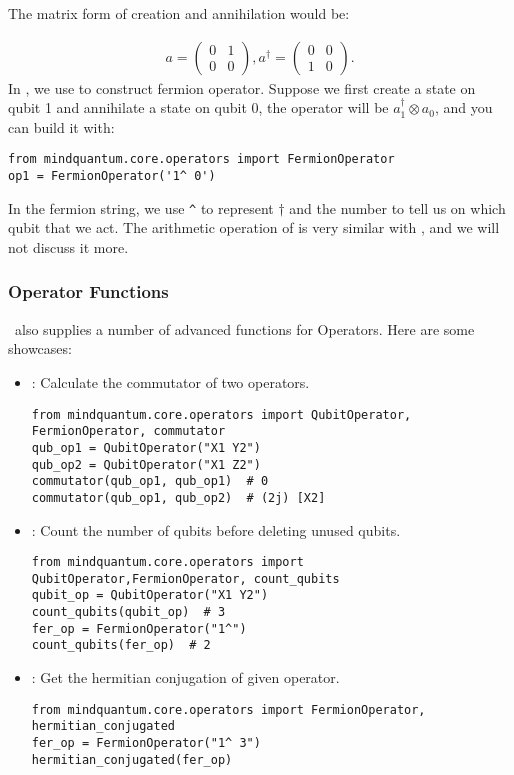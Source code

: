 The matrix form of creation and annihilation would be:

\begin{align*}
    a=\begin{pmatrix}
        0 & 1 \\
        0 & 0
    \end{pmatrix},
    a^\dagger=\begin{pmatrix}
        0 & 0 \\
        1 & 0
    \end{pmatrix}.
\end{align*}
In \MindQuantum, we use \FermionOperator to construct fermion operator. Suppose we first create a state on qubit 1 and annihilate a state on qubit 0, the operator will be $a_1^\dagger\otimes a_0$, and you can build it with:
\begin{lstlisting}
from mindquantum.core.operators import FermionOperator
op1 = FermionOperator('1^ 0')
\end{lstlisting}
In the fermion string, we use \verb|^| to represent $\dagger$ and the number to tell us on which qubit that we act. The arithmetic operation of \FermionOperator is very similar with \QubitOperator, and we will not discuss it more.


\subsubsection{Operator Functions}

\MindQuantum\ also supplies a number of advanced functions for Operators. Here are some showcases:
\begin{itemize}
    \item {} : Calculate the commutator of two operators.
          \begin{lstlisting}
from mindquantum.core.operators import QubitOperator, FermionOperator, commutator
qub_op1 = QubitOperator("X1 Y2")
qub_op2 = QubitOperator("X1 Z2")
commutator(qub_op1, qub_op1)  # 0
commutator(qub_op1, qub_op2)  # (2j) [X2]
    \end{lstlisting}
    \item {} : Count the number of qubits before deleting unused qubits.
          \begin{lstlisting}
from mindquantum.core.operators import QubitOperator,FermionOperator, count_qubits
qubit_op = QubitOperator("X1 Y2")
count_qubits(qubit_op)  # 3
fer_op = FermionOperator("1^")
count_qubits(fer_op)  # 2
    \end{lstlisting}
    \item {} : Get the hermitian conjugation of given operator.
          \begin{lstlisting}
from mindquantum.core.operators import FermionOperator, hermitian_conjugated
fer_op = FermionOperator("1^ 3")
hermitian_conjugated(fer_op)
    \end{lstlisting}
\end{itemize}

